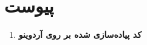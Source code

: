 \chapter*{‌پیوست}
\begin{enumerate}
	\item \textbf{کد پیاده‌سازی شده بر روی آردوینو}
\end{enumerate}